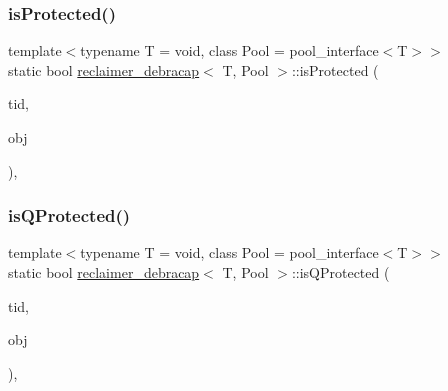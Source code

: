 \mbox{\label{classreclaimer__debracap_ae838602ad578a26512441a15dee0abcf}} 
\subsubsection{\texorpdfstring{is\+Protected()}{isProtected()}}
{\footnotesize\ttfamily template$<$typename T  = void, class Pool  = pool\+\_\+interface$<$\+T$>$$>$ \\
static bool \hyperlink{classreclaimer__debracap}{reclaimer\+\_\+debracap}$<$ T, Pool $>$\+::is\+Protected (\begin{DoxyParamCaption}\item[{const int}]{tid,  }\item[{T $\ast$const}]{obj }\end{DoxyParamCaption})\hspace{0.3cm}{\ttfamily [inline]}, {\ttfamily [static]}}

\mbox{\label{classreclaimer__debracap_a7b3ddb400b86fe1311c102bb4fcdea6a}} 
\subsubsection{\texorpdfstring{is\+Q\+Protected()}{isQProtected()}}
{\footnotesize\ttfamily template$<$typename T  = void, class Pool  = pool\+\_\+interface$<$\+T$>$$>$ \\
static bool \hyperlink{classreclaimer__debracap}{reclaimer\+\_\+debracap}$<$ T, Pool $>$\+::is\+Q\+Protected (\begin{DoxyParamCaption}\item[{const int}]{tid,  }\item[{T $\ast$const}]{obj }\end{DoxyParamCaption})\hspace{0.3cm}{\ttfamily [inline]}, {\ttfamily [static]}}

\mbox{\label{classreclaimer__debracap_a7d248af33f59e0154df2bf21f7889bc8}} 
